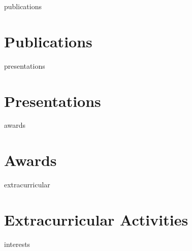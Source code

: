 \documentclass[12pt]{report} %
\begin{document}
\ifcsname publications\endcsname%
\section{Publications}
\publications{}
\fi



\ifcsname presentations\endcsname%
\section{Presentations}
\presentations{}
\fi



\ifcsname awards\endcsname%
\section{Awards}
\awards{}
\fi



\ifcsname extracurricular\endcsname%
\section{Extracurricular Activities}
\extracurricular{}
\fi



\iffalse
\ifcsname languages\endcsname%
\section{Languages}
\languages{}
\fi
\fi



\iffalse
\ifcsname interests\endcsname%
\end{document}
